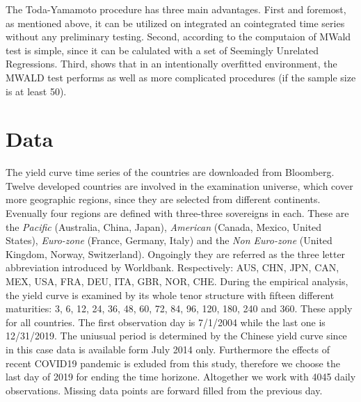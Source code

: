 \documentclass[12pt,bibliography=totoc]{article}
\begin{document}
The Toda-Yamamoto procedure  has  three main advantages.  First and foremost, as mentioned above, it can be utilized on integrated an cointegrated time series without any preliminary testing. Second, according to \cite{rambaldi1996testing} the computaion of MWald test is simple, since it can be calulated with a set of Seemingly  Unrelated  Regressions. Third, \cite{zapata1997monte} shows that in an intentionally overfitted environment, the MWALD test performs as well as more complicated procedures (if the sample size is at least 50). 



\section{Data}

The yield curve time series of the countries are downloaded from Bloomberg. Twelve developed countries are involved in the examination universe, which cover more geographic regions, since they are selected from different continents. Evenually four regions are defined with three-three sovereigns in each. These are the \textit{Pacific} (Australia, China, Japan), \textit{American} (Canada, Mexico, United States), \textit{Euro-zone} (France, Germany, Italy) and the \textit{Non Euro-zone} (United Kingdom, Norway, Switzerland). Ongoingly they are referred as the three letter abbreviation introduced by Worldbank. Respectively:  AUS, CHN, JPN, CAN, MEX, USA, FRA, DEU, ITA, GBR, NOR, CHE. During the empirical analysis, the yield curve is examined by its whole tenor structure with fifteen different maturities: 3, 6, 12, 24, 36, 48, 60, 72, 84, 96, 120, 180, 240 and 360. These apply for all countries. The first observation day is 7/1/2004 while the last one is 12/31/2019. The uniusual period is determined by the Chinese yield curve since in this case data is available form July 2014 only. Furthermore the effects of recent COVID19 pandemic is exluded from this study, therefore we choose the last day of 2019 for ending the time horizone. Altogether we work with 4045 daily observations. Missing data points are forward filled from the previous day.

\end{document}
